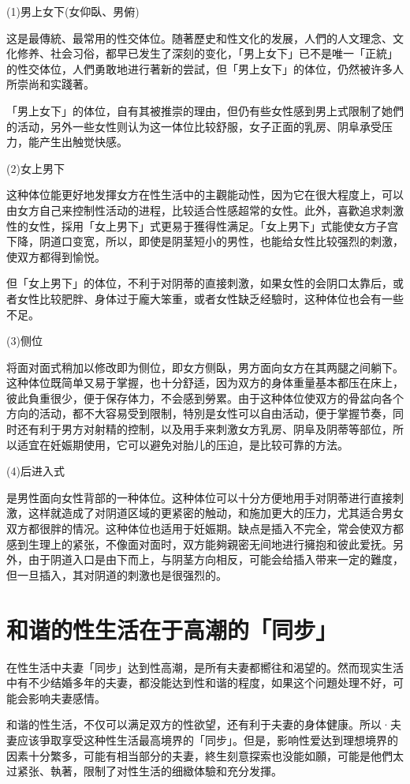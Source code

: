 \documentclass[12pt,UTF8]{ctexbook}
\begin{document}
(1)男上女下(女仰臥、男俯)

这是最傳統、最常用的性交体位。随著歷史和性文化的发展，人們的人文理念、文化修养、社会习俗，都早已发生了深刻的变化，「男上女下」已不是唯一「正統」的性交体位，人們勇敢地进行著新的尝試，但「男上女下」的体位，仍然被许多人所崇尚和实踐著。

「男上女下」的体位，自有其被推崇的理由，但仍有些女性感到男上式限制了她們的活动，另外一些女性则认为这一体位比较舒服，女子正面的乳房、阴阜承受压力，能产生出触觉快感。

(2)女上男下

这种体位能更好地发揮女方在性生活中的主觀能动性，因为它在很大程度上，可以由女方自己来控制性活动的进程，比较适合性感超常的女性。此外，喜歡追求刺激性的女性，採用「女上男下」式更易于獲得性满足。「女上男下」式能使女方子宫下降，阴道口变宽，所以，即使是阴茎短小的男性，也能给女性比较强烈的刺激，使双方都得到愉悦。

但「女上男下」的体位，不利于对阴蒂的直接刺激，如果女性的会阴口太靠后，或者女性比较肥胖、身体过于龐大笨重，或者女性缺乏经驗时，这种体位也会有一些不足。

(3)侧位

将面对面式稍加以修改即为侧位，即女方侧臥，男方面向女方在其两腿之间躺下。这种体位既简单又易于掌握，也十分舒适，因为双方的身体重量基本都压在床上，彼此負重很少，便于保存体力，不会感到勞累。由于这种体位使双方的骨盆向各个方向的活动，都不大容易受到限制，特別是女性可以自由活动，便于掌握节奏，同时还有利于男方对射精的控制，以及用手来刺激女方乳房、阴阜及阴蒂等部位，所以适宜在妊娠期使用，它可以避免对胎儿的压迫，是比较可靠的方法。

(4)后进入式

是男性面向女性背部的一种体位。这种体位可以十分方便地用手对阴蒂进行直接刺激，这样就造成了对阴道区域的更紧密的触动，和施加更大的压力，尤其适合男女双方都很胖的情况。这种体位也适用于妊娠期。缺点是插入不完全，常会使双方都感到生理上的紧张，不像面对面时，双方能夠親密无间地进行擁抱和彼此爱抚。另外，由于阴道入口是由下而上，与阴茎方向相反，可能会给插入带来一定的難度，但一旦插入，其对阴道的刺激也是很强烈的。

\section{和谐的性生活在于高潮的「同步」}

在性生活中夫妻「同步」达到性高潮，是所有夫妻都嚮往和渴望的。然而现实生活中有不少结婚多年的夫妻，都没能达到性和谐的程度，如果这个问題处理不好，可能会影响夫妻感情。

和谐的性生活，不仅可以满足双方的性欲望，还有利于夫妻的身体健康。所以·夫妻应该爭取享受这种性生活最高境界的「同步」。但是，影响性爱达到理想境界的因素十分繁多，可能有相当部分的夫妻，終生刻意探索也没能如願，可能是他們太过紧张、執著，限制了对性生活的细緻体驗和充分发揮。
\end{document}
